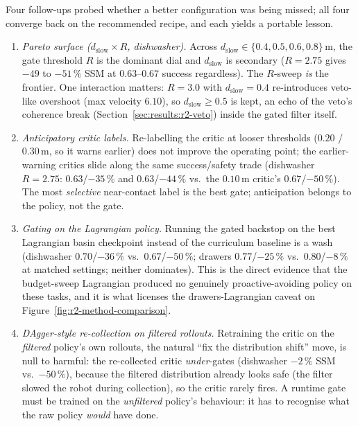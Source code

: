 \documentclass[11pt,a4paper]{report}
\newcommand{\ssm}{SSM}
\begin{document}
Four follow-ups probed whether a better configuration was being
missed; all four converge back on the recommended recipe, and each
yields a portable lesson.

\begin{enumerate}[topsep=2pt,itemsep=2pt]
\item \emph{Pareto surface ($d_{\mathrm{slow}} \times R$,
  dishwasher).} Across $d_{\mathrm{slow}} \in \{0.4, 0.5, 0.6,
  0.8\}$\,m, the gate threshold $R$ is the dominant dial and
  $d_{\mathrm{slow}}$ is secondary ($R = 2.75$ gives $-49$ to
  $-51\,\%$ \ssm{} at $0.63$--$0.67$ success regardless). The
  $R$-sweep \emph{is} the frontier. One interaction matters:
  $R = 3.0$ with $d_{\mathrm{slow}} = 0.4$ re-introduces veto-like
  overshoot (max velocity $6.10$), so $d_{\mathrm{slow}} \geq 0.5$
  is kept, an echo of the veto's coherence break
  (Section~\ref{sec:results:r2-veto}) inside the gated filter
  itself.
\item \emph{Anticipatory critic labels.} Re-labelling the critic at
  looser thresholds ($0.20$ / $0.30$\,m, so it warns earlier) does
  not improve the operating point; the earlier-warning critics slide
  along the same success/safety trade (dishwasher $R = 2.75$:
  $0.63$/$-35\,\%$ and $0.63$/$-44\,\%$ vs.\ the $0.10$\,m critic's
  $0.67$/$-50\,\%$). The most \emph{selective} near-contact label is
  the best gate; anticipation belongs to the policy, not the gate.
\item \emph{Gating on the Lagrangian policy.} Running the gated
  backstop on the best Lagrangian basin checkpoint instead of the
  curriculum baseline is a wash (dishwasher $0.70$/$-36\,\%$ vs.\
  $0.67$/$-50\,\%$; drawers $0.77$/$-25\,\%$ vs.\ $0.80$/$-8\,\%$ at
  matched settings; neither dominates). This is the direct evidence
  that the budget-sweep Lagrangian produced no genuinely
  proactive-avoiding policy on these tasks, and it is what licenses
  the drawers-Lagrangian caveat on
  Figure~\ref{fig:r2-method-comparison}.
\item \emph{DAgger-style re-collection on filtered rollouts.}
  Retraining the critic on the \emph{filtered} policy's own rollouts,
  the natural ``fix the distribution shift'' move, is null to
  harmful: the re-collected critic \emph{under}-gates (dishwasher
  $-2\,\%$ \ssm{} vs.\ $-50\,\%$), because the filtered distribution
  already looks safe (the filter slowed the robot during
  collection), so the critic rarely fires. A runtime gate must be
  trained on the \emph{unfiltered} policy's behaviour: it has to
  recognise what the raw policy \emph{would} have done.
\end{enumerate}
\end{document}

